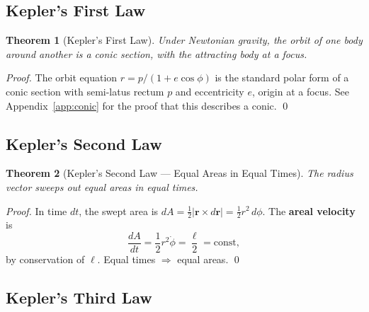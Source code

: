 \documentclass[12pt,a4paper]{article}
\theoremstyle{plain}
\newtheorem{theorem}{Theorem}[section]
\theoremstyle{definition}
\theoremstyle{remark}
\newcommand{\ve}[1]{\mathbf{#1}}           %
\newcommand{\rv}{\ve{r}}
\begin{document}
\subsection{Kepler's First Law}

\begin{theorem}[Kepler's First Law]\label{thm:K1}
Under Newtonian gravity, the orbit of one body around another is a conic section, with the attracting body at a focus.
\end{theorem}
\begin{proof}
The orbit equation $r = p/(1+e\cos\phi)$ is the standard polar form of a conic section with semi-latus rectum $p$ and eccentricity $e$, origin at a focus. See Appendix~\ref{app:conic} for the proof that this describes a conic. \qed
\end{proof}

\subsection{Kepler's Second Law}

\begin{theorem}[Kepler's Second Law --- Equal Areas in Equal Times]\label{thm:K2}
The radius vector sweeps out equal areas in equal times.
\end{theorem}
\begin{proof}
In time $dt$, the swept area is $dA = \tfrac{1}{2}|\rv\times d\rv| = \tfrac{1}{2}r^2\,d\phi$. The \textbf{areal velocity} is
\[
  \frac{dA}{dt} = \frac{1}{2}r^2\dot\phi = \frac{\ell}{2} = \mathrm{const},
\]
by conservation of $\ell$. Equal times $\Rightarrow$ equal areas. \qed
\end{proof}

\subsection{Kepler's Third Law}
\end{document}
